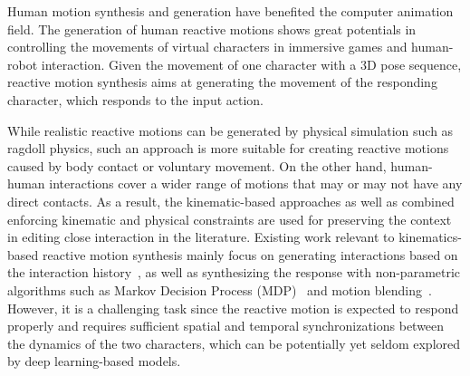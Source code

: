 \documentclass[times,twocolumn,final]{elsarticle}
\begin{document}

Human motion synthesis and generation \cite{shum2008interaction,ho2009character} have benefited the computer animation field. The generation of human reactive motions shows great potentials in controlling the movements of virtual characters in immersive games and human-robot interaction. Given the movement of one character with a 3D pose sequence, reactive motion synthesis aims at generating the movement of the responding character, which responds to the input action. 

While realistic reactive motions can be generated by physical simulation such as ragdoll physics, such an approach is more suitable for creating reactive motions caused by body contact or voluntary movement. On the other hand, human-human interactions cover a wider range of motions that may or may not have any direct contacts. As a result, the kinematic-based approaches \cite{Ho:SIGGRAPH10,ho2013interactive} as well as combined enforcing kinematic and physical constraints \cite{Yin:TVCG2019,Ho:VRST2014} are used for preserving the context in editing close interaction in the literature. Existing work relevant to kinematics-based reactive motion synthesis mainly focus on generating interactions based on the interaction history~\cite{kundu2020cross,baruah2020multimodal}, as well as synthesizing the response with non-parametric algorithms such as Markov Decision Process (MDP)~\cite{huang2014action,shu2016learning,shum12simulating} and motion blending~\cite{komura2005animating,ho2013interactive}. However, it is a challenging task since the reactive motion is expected to respond properly and requires sufficient spatial and temporal synchronizations between the dynamics of the two characters, which can be potentially yet seldom explored by deep learning-based models. 

\end{document}
